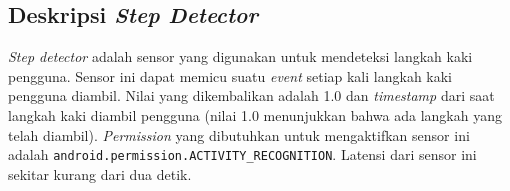 \subsection{Deskripsi \textit{Step Detector}}
\textit{Step detector} adalah sensor yang digunakan untuk mendeteksi langkah kaki pengguna. Sensor ini dapat memicu suatu \textit{event} setiap kali langkah kaki pengguna diambil. Nilai yang dikembalikan adalah 1.0 dan \textit{timestamp} dari saat langkah kaki diambil pengguna (nilai 1.0 menunjukkan bahwa ada langkah yang telah diambil). \textit{Permission} yang dibutuhkan untuk mengaktifkan sensor ini adalah \texttt{android.permission.ACTIVITY\_RECOGNITION}. Latensi dari sensor ini sekitar kurang dari dua detik. 

